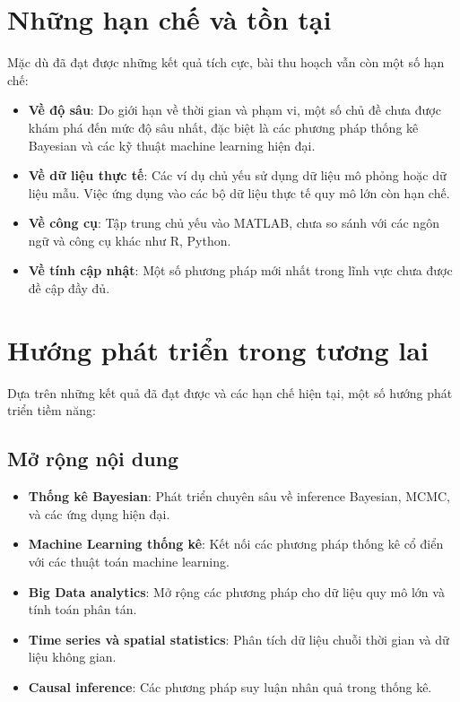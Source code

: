 \section*{Những hạn chế và tồn tại}

Mặc dù đã đạt được những kết quả tích cực, bài thu hoạch vẫn còn một số hạn chế:

\begin{itemize}
    \item \textbf{Về độ sâu}: Do giới hạn về thời gian và phạm vi, một số chủ đề chưa được khám phá đến mức độ sâu nhất, đặc biệt là các phương pháp thống kê Bayesian và các kỹ thuật machine learning hiện đại.
    
    \item \textbf{Về dữ liệu thực tế}: Các ví dụ chủ yếu sử dụng dữ liệu mô phỏng hoặc dữ liệu mẫu. Việc ứng dụng vào các bộ dữ liệu thực tế quy mô lớn còn hạn chế.
    
    \item \textbf{Về công cụ}: Tập trung chủ yếu vào MATLAB, chưa so sánh với các ngôn ngữ và công cụ khác như R, Python.
    
    \item \textbf{Về tính cập nhật}: Một số phương pháp mới nhất trong lĩnh vực chưa được đề cập đầy đủ.
\end{itemize}

\section*{Hướng phát triển trong tương lai}

Dựa trên những kết quả đã đạt được và các hạn chế hiện tại, một số hướng phát triển tiềm năng:

\subsection*{Mở rộng nội dung}
\begin{itemize}
    \item \textbf{Thống kê Bayesian}: Phát triển chuyên sâu về inference Bayesian, MCMC, và các ứng dụng hiện đại.
    
    \item \textbf{Machine Learning thống kê}: Kết nối các phương pháp thống kê cổ điển với các thuật toán machine learning.
    
    \item \textbf{Big Data analytics}: Mở rộng các phương pháp cho dữ liệu quy mô lớn và tính toán phân tán.
    
    \item \textbf{Time series và spatial statistics}: Phân tích dữ liệu chuỗi thời gian và dữ liệu không gian.
    
    \item \textbf{Causal inference}: Các phương pháp suy luận nhân quả trong thống kê.
\end{itemize}

